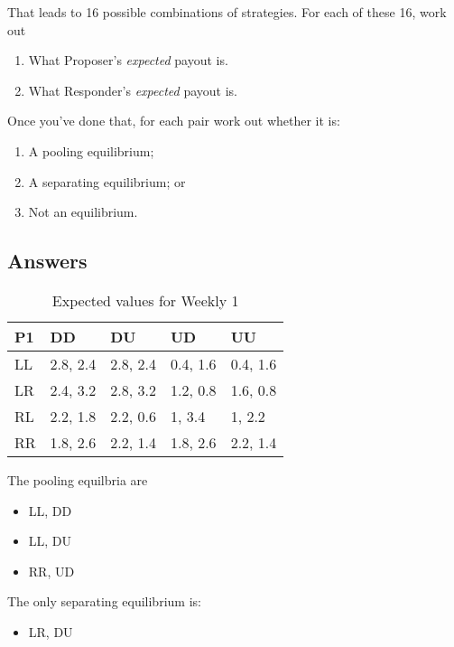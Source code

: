 \documentclass[
  12pt,
  letterpaper,
  DIV=11,
  numbers=noendperiod]{scrartcl}
\providecommand{\tightlist}{%
  \setlength{\itemsep}{0pt}\setlength{\parskip}{0pt}}\usepackage{longtable,booktabs,array}
\begin{document}
That leads to 16 possible combinations of strategies. For each of these
16, work out

\begin{enumerate}
\def\labelenumi{\Alph{enumi}.}
\tightlist
\item
  What Proposer's \emph{expected} payout is.
\item
  What Responder's \emph{expected} payout is.
\end{enumerate}

Once you've done that, for each pair work out whether it is:

\begin{enumerate}
\def\labelenumi{\Alph{enumi}.}
\tightlist
\item
  A pooling equilibrium;
\item
  A separating equilibrium; or
\item
  Not an equilibrium.
\end{enumerate}

\subsection{Answers}\label{answers}

\begin{longtable}[]{@{}lllll@{}}

\caption{\label{tbl-main-tree}Expected values for Weekly 1}

\tabularnewline

\toprule\noalign{}
P1 & DD & DU & UD & UU \\
\midrule\noalign{}
\endhead
\bottomrule\noalign{}
\endlastfoot
LL & 2.8, 2.4 & 2.8, 2.4 & 0.4, 1.6 & 0.4, 1.6 \\
LR & 2.4, 3.2 & 2.8, 3.2 & 1.2, 0.8 & 1.6, 0.8 \\
RL & 2.2, 1.8 & 2.2, 0.6 & 1, 3.4 & 1, 2.2 \\
RR & 1.8, 2.6 & 2.2, 1.4 & 1.8, 2.6 & 2.2, 1.4 \\

\end{longtable}

The pooling equilbria are

\begin{itemize}
\tightlist
\item
  LL, DD
\item
  LL, DU
\item
  RR, UD
\end{itemize}

The only separating equilibrium is:

\begin{itemize}
\tightlist
\item
  LR, DU
\end{itemize}
\end{document}
